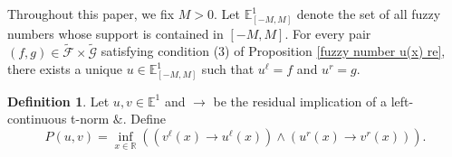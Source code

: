 \documentclass[preprint,3p,times]{elsarticle}
\theoremstyle{plain}
\theoremstyle{definition}
\newtheorem{definition}[thm]{Definition}
\numberwithin{equation}{section}
\begin{document}
Throughout this paper, we fix \(M>0\). Let
\(\mathbb{E}^1_{[-M,M]}\) denote the set of all fuzzy numbers whose
support is contained in \([-M,M]\).
For every pair $(f,g)\in\widetilde{\mathcal F}
\times\widetilde{\mathcal G}$ satisfying condition (3) of Proposition \ref{fuzzy number u(x) re}, there exists a unique $u\in\mathbb E^1_{[-M,M]}$
such that \(u^\ell = f\) and \(u^r = g\).

\begin{definition}

Let \( u, v \in \mathbb{E}^1 \) and \( \rightarrow \) be the residual implication of a  left-continuous t-norm \( \& \). Define
\[
P(u, v) = \inf_{x \in \mathbb{R}} \left( (v^\ell(x) \rightarrow u^\ell(x)) \wedge (u^r(x) \rightarrow v^r(x)) \right).
\]

\end{definition}
\end{document}
